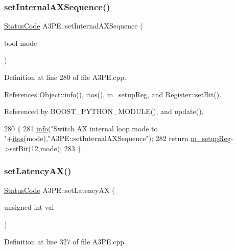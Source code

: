 \subsubsection{\texorpdfstring{set\+Internal\+A\+X\+Sequence()}{setInternalAXSequence()}}
{\footnotesize\ttfamily \hyperlink{classStatusCode}{Status\+Code} A3\+P\+E\+::set\+Internal\+A\+X\+Sequence (\begin{DoxyParamCaption}\item[{bool}]{mode }\end{DoxyParamCaption})}



Definition at line 280 of file A3\+P\+E.\+cpp.



References Object\+::info(), itos(), m\+\_\+setup\+Reg, and Register\+::set\+Bit().



Referenced by B\+O\+O\+S\+T\+\_\+\+P\+Y\+T\+H\+O\+N\+\_\+\+M\+O\+D\+U\+L\+E(), and update().


\begin{DoxyCode}
280                                                \{
281   \hyperlink{classObject_a644fd329ea4cb85f54fa6846484b84a8}{info}(\textcolor{stringliteral}{"Switch AX internal loop mode to "}+\hyperlink{Tools_8h_af330027dbdafb9a30768b3613c553e60}{itos}(mode),\textcolor{stringliteral}{"A3PE::setInternalAXSequence"});
282   \textcolor{keywordflow}{return} \hyperlink{classA3PE_a142fa10b7e705c4701ae21678ec2ec8a}{m\_setupReg}->\hyperlink{classRegister_ab094246dd12aa7e0aa0ca917f4e70b31}{setBit}(12,mode);
283 \}
\end{DoxyCode}
\mbox{\label{classA3PE_a53882e1272e8146e51837904ea00f33c}} 
\subsubsection{\texorpdfstring{set\+Latency\+A\+X()}{setLatencyAX()}}
{\footnotesize\ttfamily \hyperlink{classStatusCode}{Status\+Code} A3\+P\+E\+::set\+Latency\+AX (\begin{DoxyParamCaption}\item[{unsigned int}]{val }\end{DoxyParamCaption})}



Definition at line 327 of file A3\+P\+E.\+cpp.



